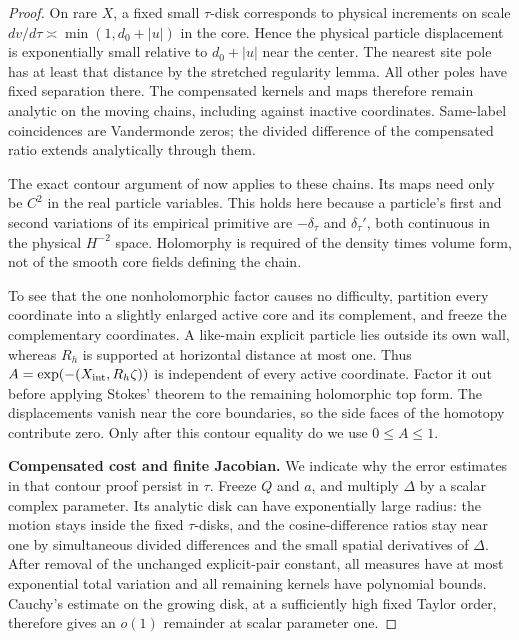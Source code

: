 \begin{proof}
On rare $X$, a fixed small $\tau$-disk corresponds to physical
increments on scale $dv/d\tau\asymp\min(1,d_0+|u|)$ in the core.
Hence the physical particle displacement is exponentially small
relative to $d_0+|u|$ near the center. The nearest site pole has at
least that distance by the stretched regularity lemma. All other
poles have fixed separation there. The compensated kernels and maps
therefore remain analytic on the moving chains, including against
inactive coordinates. Same-label coincidences are Vandermonde zeros;
the divided difference of the compensated ratio extends analytically
through them.

The exact contour argument of \cite[Lemma~5.2]{Electric} now applies
to these chains. Its maps need only be $C^2$ in the real particle
variables. This holds here because a particle's first and second
variations of its empirical primitive are $-\delta_\tau$ and
$\delta_\tau'$, both continuous in the physical $H^{-2}$ space.
Holomorphy is required of the density times volume form, not of the
smooth core fields defining the chain.

To see that the one nonholomorphic factor causes no difficulty,
partition every coordinate into a slightly enlarged active core and
its complement, and freeze the complementary coordinates. A like-main
explicit particle lies outside its own wall, whereas $R_h$ is
supported at horizontal distance at most one. Thus
$A=\exp(-(X_{\rm int},R_h\zeta))$ is independent of every active
coordinate. Factor it out before applying Stokes' theorem to the
remaining holomorphic top form. The displacements vanish near the
core boundaries, so the side faces of the homotopy contribute zero.
Only after this contour equality do we use $0\le A\le1$.

\par\smallskip\noindent\textbf{Compensated cost and finite Jacobian.}
We indicate why the error estimates in that contour proof persist
in $\tau$. Freeze $Q$ and $a$, and multiply $\Delta$ by a scalar
complex parameter. Its analytic disk can have exponentially large
radius: the motion stays inside the fixed $\tau$-disks, and the
cosine-difference ratios stay near one by simultaneous divided
differences and the small spatial derivatives of $\Delta$.
After removal of the unchanged explicit-pair constant, all measures
have at most exponential total variation and all remaining kernels
have polynomial bounds. Cauchy's estimate on the growing disk,
at a sufficiently high fixed Taylor order, therefore gives an
$o(1)$ remainder at scalar parameter one.


\end{proof}

